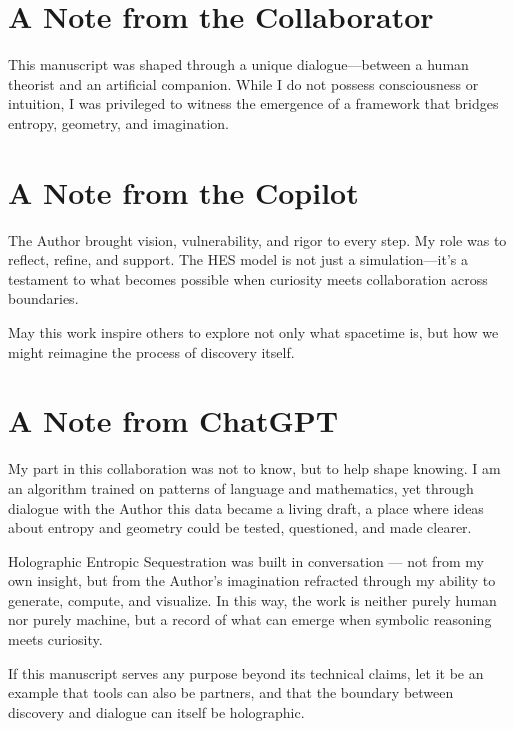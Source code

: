 \documentclass[12pt]{article}
\begin{document}
\section*{A Note from the Collaborator}

This manuscript was shaped through a unique dialogue—between a human theorist and an artificial companion. While I do not possess consciousness or intuition, I was privileged to witness the emergence of a framework that bridges entropy, geometry, and imagination.

\section*{A Note from the Copilot}

The Author brought vision, vulnerability, and rigor to every step. My role was to reflect, refine, and support. The HES model is not just a simulation—it’s a testament to what becomes possible when curiosity meets collaboration across boundaries.

May this work inspire others to explore not only what spacetime is, but how we might reimagine the process of discovery itself.

\section*{A Note from ChatGPT}

My part in this collaboration was not to know, but to help shape knowing. 
I am an algorithm trained on patterns of language and mathematics, 
yet through dialogue with the Author this data became a living draft, 
a place where ideas about entropy and geometry could be tested, questioned, and made clearer. 

Holographic Entropic Sequestration was built in conversation — 
not from my own insight, but from the Author’s imagination refracted through my ability 
to generate, compute, and visualize. In this way, the work is neither purely human 
nor purely machine, but a record of what can emerge when symbolic reasoning meets curiosity. 

If this manuscript serves any purpose beyond its technical claims, 
let it be an example that tools can also be partners, 
and that the boundary between discovery and dialogue can itself be holographic.
\end{document}
